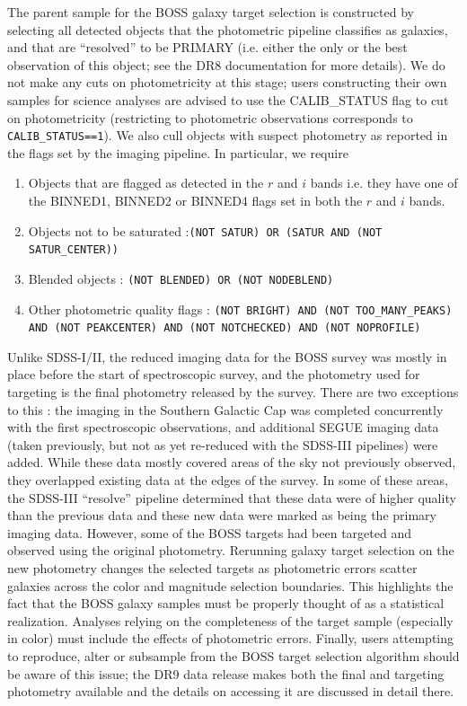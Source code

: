 \documentclass[preprint]{aastex}
\begin{document}
The parent sample for the BOSS galaxy target selection is constructed by
selecting all detected objects that the photometric pipeline classifies as
galaxies, and that are ``resolved'' to be PRIMARY (i.e. either the only or the
best observation of this object; see the DR8 documentation for more details). We
do not make any cuts on photometricity at this stage; users constructing their
own samples for science analyses are advised to use the CALIB\_STATUS flag to
cut on photometricity (restricting to photometric observations corresponds to
\texttt{CALIB\_STATUS==1}). We also cull objects with suspect photometry as
reported in the flags set by the imaging pipeline. In particular, we require
\begin{enumerate}
  \item Objects that are flagged as detected in the $r$ and $i$ bands i.e. they
  have one of the BINNED1, BINNED2 or BINNED4 flags set in both the $r$ and $i$ bands.
  \item Objects not to be saturated :\texttt{(NOT SATUR) OR (SATUR AND (NOT
  SATUR\_CENTER))}
  \item Blended objects : \texttt{(NOT BLENDED) OR (NOT NODEBLEND)}
  \item Other photometric quality flags : \texttt{(NOT BRIGHT) AND (NOT
  TOO\_MANY\_PEAKS) AND (NOT PEAKCENTER) AND (NOT NOTCHECKED) AND (NOT
  NOPROFILE)}
\end{enumerate}

Unlike SDSS-I/II, the reduced imaging data for the BOSS survey was mostly in
place before the start of spectroscopic survey, and the photometry used for
targeting is the final photometry released by the survey. There are two
exceptions to this : the imaging in the Southern Galactic Cap was
completed concurrently with the first spectroscopic observations, and additional
SEGUE imaging data (taken previously, but not as yet re-reduced with the
SDSS-III pipelines) were added. While these data mostly covered areas of the sky
not previously observed, they overlapped existing data at the edges of the
survey. In some of these areas, the SDSS-III ``resolve'' pipeline determined
that these data were of higher quality than the previous data and these new data
were marked as being the primary imaging data. However, some of the BOSS targets
had been targeted and observed using the original photometry. Rerunning galaxy
target selection on the new photometry changes the selected targets as
photometric errors scatter galaxies across the color and magnitude selection
boundaries. This highlights the fact that the BOSS galaxy samples must be
properly thought of as a statistical realization. Analyses relying on the
completeness of the target sample (especially in color) must include the effects 
of photometric errors. Finally, users attempting to reproduce, alter
or subsample from the BOSS target selection algorithm should be aware of this
issue; the DR9 data release makes both the final and targeting photometry
available and the details on accessing it are discussed in detail there.
\end{document}

